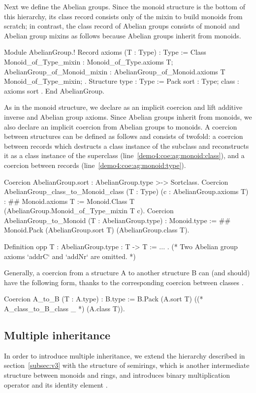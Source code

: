 \documentclass[a4paper,UKenglish,cleveref, autoref]{lipics-v2019}
\newcommand{\mixin}{mixin}
\newcommand{\mixins}{mixins}
\theoremstyle{implem}
\theoremstyle{implem}
\theoremstyle{command}
\begin{document}
Next we define the Abelian groups.
Since the monoid structure is the bottom of this hierarchy, its class record  consists only of the \mixin{} to build monoids from scratch; in contrast, the class record of Abelian groups consists of monoid and Abelian group \mixins{} as follows because Abelian groups inherit from monoids.
\begin{coqcode}
Module AbelianGroup.!
Record axioms (T : Type) : Type := Class {
  Monoid_of_Type_mixin : Monoid_of_Type.axioms T;
  AbelianGroup_of_Monoid_mixin : AbelianGroup_of_Monoid.axioms T Monoid_of_Type_mixin; }.
Structure type : Type := Pack { sort : Type; class : axioms sort }.
End AbelianGroup.
\end{coqcode}
As in the monoid structure, we declare  as an implicit coercion and lift additive inverse  and Abelian group axioms.
Since Abelian groups inherit from monoids, we also declare an implicit coercion from Abelian groups to monoids.
A coercion between structures can be defined as follows and consists of twofold: a coercion between  records which destructs a class instance of the subclass and reconstructs it as a class instance of the superclass (line~\ref{demo4:coe:ag:monoid:class}), and a coercion between  records (line~\ref{demo4:coe:ag:monoid:type}).
\begin{coqcode}
Coercion AbelianGroup.sort : AbelianGroup.type >-> Sortclass.
Coercion AbelianGroup_class_to_Monoid_class (T : Type) (c : AbelianGroup.axioms T) : #\label{demo4:coe:ag:monoid:class}#
  Monoid.axioms T :=
  Monoid.Class T (AbelianGroup.Monoid_of_Type_mixin T c).
Coercion AbelianGroup_to_Monoid (T : AbelianGroup.type) : Monoid.type := #\label{demo4:coe:ag:monoid:type}#
  Monoid.Pack (AbelianGroup.sort T) (AbelianGroup.class T).

Definition opp {T : AbelianGroup.type} : T -> T := ... .
(* Two Abelian group axioms `addrC` and `addNr` are omitted. *)
\end{coqcode}

Generally, a coercion from a structure A to another structure B can (and should) have the following form, thanks to the corresponding coercion between classes .
\begin{coqcode}
Coercion A_to_B (T : A.type) : B.type :=
  B.Pack (A.sort T) ((* A_class_to_B_class _ *) (A.class T)).
\end{coqcode}

\subsection{Multiple inheritance}
In order to introduce multiple inheritance, we extend the hierarchy described in
section~\ref{subsec:v3} with the structure of semirings, which is another
intermediate structure between monoids and rings, and introduces binary
multiplication operator  and its identity element .\\
\end{document}
